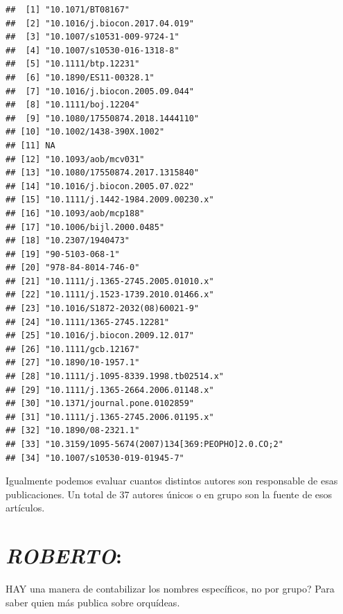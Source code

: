 \documentclass[
]{book}
\theoremstyle{definition}
\theoremstyle{definition}
\theoremstyle{definition}
\theoremstyle{definition}
\theoremstyle{remark}
\begin{document}
\begin{verbatim}
##  [1] "10.1071/BT08167"                               
##  [2] "10.1016/j.biocon.2017.04.019"                  
##  [3] "10.1007/s10531-009-9724-1"                     
##  [4] "10.1007/s10530-016-1318-8"                     
##  [5] "10.1111/btp.12231"                             
##  [6] "10.1890/ES11-00328.1"                          
##  [7] "10.1016/j.biocon.2005.09.044"                  
##  [8] "10.1111/boj.12204"                             
##  [9] "10.1080/17550874.2018.1444110"                 
## [10] "10.1002/1438-390X.1002"                        
## [11] NA                                              
## [12] "10.1093/aob/mcv031"                            
## [13] "10.1080/17550874.2017.1315840"                 
## [14] "10.1016/j.biocon.2005.07.022"                  
## [15] "10.1111/j.1442-1984.2009.00230.x"              
## [16] "10.1093/aob/mcp188"                            
## [17] "10.1006/bijl.2000.0485"                        
## [18] "10.2307/1940473"                               
## [19] "90-5103-068-1"                                 
## [20] "978-84-8014-746-0"                             
## [21] "10.1111/j.1365-2745.2005.01010.x"              
## [22] "10.1111/j.1523-1739.2010.01466.x"              
## [23] "10.1016/S1872-2032(08)60021-9"                 
## [24] "10.1111/1365-2745.12281"                       
## [25] "10.1016/j.biocon.2009.12.017"                  
## [26] "10.1111/gcb.12167"                             
## [27] "10.1890/10-1957.1"                             
## [28] "10.1111/j.1095-8339.1998.tb02514.x"            
## [29] "10.1111/j.1365-2664.2006.01148.x"              
## [30] "10.1371/journal.pone.0102859"                  
## [31] "10.1111/j.1365-2745.2006.01195.x"              
## [32] "10.1890/08-2321.1"                             
## [33] "10.3159/1095-5674(2007)134[369:PEOPHO]2.0.CO;2"
## [34] "10.1007/s10530-019-01945-7"
\end{verbatim}

Igualmente podemos evaluar cuantos distintos autores son responsable de esas publicaciones. Un total de 37 autores únicos o en grupo son la fuente de esos artículos.

\section{\texorpdfstring{\emph{ROBERTO}:}{ROBERTO:}}\label{roberto}

HAY una manera de contabilizar los nombres específicos, no por grupo? Para saber quien más publica sobre orquídeas.
\end{document}
